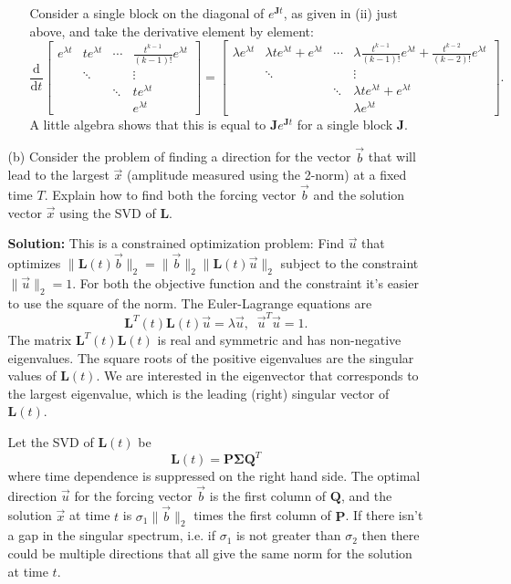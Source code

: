 \documentclass[11pt,fleqn]{article}
\newcommand{\mat}[1]{\mathbf{#1}}
\newcommand{\dd}[3]{\frac{\mathrm{d}^{#3}{#1}}{\mathrm{d}{#2}^{#3}}}
\begin{document}
\begin{enumerate}
\begin{itemize}
\begin{itemize}
     		Consider a single block on the diagonal of $e^{\mat{J}t}$, as given in (ii) just above, and take the derivative element by element:
     		 \[\dd{}{t}{}\left[\begin{array}{cccc}e^{\lambda t}&te^{\lambda t}&\cdots&\frac{t^{k-1}}{(k-1)!}e^{\lambda t}\\&\ddots&&\vdots\\&&\ddots&te^{\lambda t}\\&&&e^{\lambda t}\end{array}\right] = \left[\begin{array}{cccc}\lambda e^{\lambda t}&\lambda te^{\lambda t}+e^{\lambda t}&\cdots&\lambda\frac{t^{k-1}}{(k-1)!}e^{\lambda t} + \frac{t^{k-2}}{(k-2)!}e^{\lambda t}\\&\ddots&&\vdots\\&&\ddots&\lambda te^{\lambda t}+e^{\lambda t}\\&&&\lambda e^{\lambda t}\end{array}\right]. \]
     		 A little algebra shows that this is equal to $\mathbf{J}e^{\mat{J}t}$ for a single block {\bf J}.
     		 
     \end{itemize}
	\item[(b)] Consider the problem of finding a direction for the vector $\vec{b}$ that will lead to the largest $\vec{x}$ (amplitude measured using the 2-norm) at a fixed time $T$. Explain how to find both the forcing vector $\vec{b}$ and the solution vector $\vec{x}$ using the SVD of $\mathbf{L}$.
	
	{\bf Solution:} This is a constrained optimization problem: Find $\vec{u}$ that optimizes $\|\mathbf{L}(t)\vec{b}\|_2 = \|\vec{b}\|_2\|\mathbf{L}(t)\vec{u}\|_2$ subject to the constraint $\|\vec{u}\|_2=1$.
	For both the objective function and the constraint it's easier to use the square of the norm. The Euler-Lagrange equations are
	\[\mathbf{L}^T(t)\mathbf{L}(t)\vec{u} = \lambda\vec{u},\;\;\vec{u}^T\vec{u}=1.\]
	The matrix $\mathbf{L}^T(t)\mathbf{L}(t)$ is real and symmetric and has non-negative eigenvalues. The square roots of the positive eigenvalues are the singular values of $\mathbf{L}(t)$. We are interested in the eigenvector that corresponds to the largest eigenvalue, which is the leading (right) singular vector of $\mathbf{L}(t)$.
	
	Let the SVD of $\mathbf{L}(t)$ be
	\[\mathbf{L}(t) = \mathbf{P\Sigma Q}^T\]
	where time dependence is suppressed on the right hand side.
	The optimal direction $\vec{u}$ for the forcing vector $\vec{b}$ is the first column of $\mathbf{Q}$, and the solution $\vec{x}$ at time $t$ is $\sigma_1\|\vec{b}\|_2$ times the first column of $\mathbf{P}$. If there isn't a gap in the singular spectrum, i.e. if $\sigma_1$ is not greater than $\sigma_2$ then there could be multiple directions that all give the same norm for the solution at time $t$. 
	

\end{itemize}
\end{enumerate}
\end{document}
